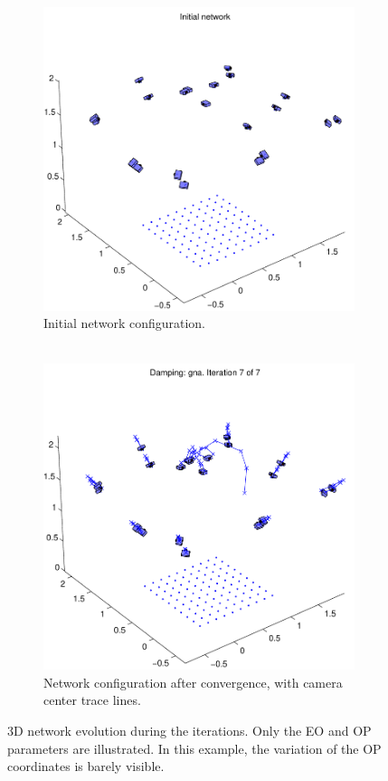 \documentclass{article}
\begin{document}
\begin{figure}
  \centering
  \begin{subfigure}[b]{0.49\textwidth}
    \includegraphics[width=\textwidth]{ill/ccamx0}
    \caption{Initial network configuration.\\~}
    \label{fig:camx0}
  \end{subfigure}%
  \begin{subfigure}[b]{0.49\textwidth}
    \includegraphics[width=\textwidth]{ill/ccamxfinal}
    \caption{Network configuration after convergence, with camera
      center trace lines.}
    \label{fig:camxfinal}
  \end{subfigure}
  \caption{3D network evolution during the iterations. Only the EO and
    OP parameters are illustrated. In this example, the variation of
    the OP coordinates is barely visible. }\label{fig:net3DTrace}
\end{figure}
\end{document}
